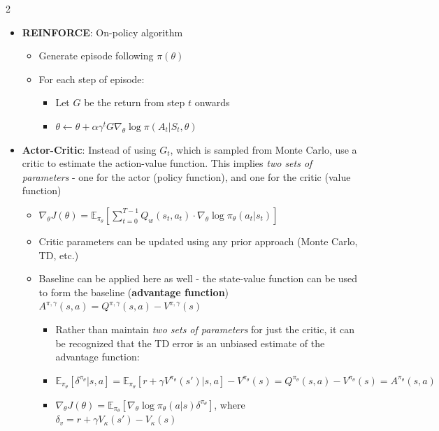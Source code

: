 \documentclass{article}
\providecommand{\tightlist}{%
  \setlength{\itemsep}{\GlobalItemSep}\setlength{\parskip}{\GlobalListParSkip}}
\newlength{\GlobalItemSep}
\newlength{\GlobalListParSkip}
\begin{document}
\begin{multicols}{2}
\begin{itemize}
  \begin{itemize}
  \tightlist
  \item
    \(\nabla_\theta J(\theta) = \mathbb{E}_\tau [\sum_{t=0}^{T-1} (G_t - b) \cdot \nabla_\theta \log \pi_\theta (a_t | s_t)]\)
    where \(b = \mathbb{E} [r_t + r_{t+1} + ... + r_{T-1}]\) (expected
    return)
  \end{itemize}
\item
  \textbf{REINFORCE}: On-policy algorithm

  \begin{itemize}
  \tightlist
  \item
    Generate episode following \(\pi(\theta)\)
  \item
    For each step of episode:

    \begin{itemize}
    \tightlist
    \item
      Let \(G\) be the return from step \(t\) onwards
    \item
      \(\theta \leftarrow \theta + \alpha \gamma^t G \nabla_\theta \log \pi (A_t | S_t, \theta)\)
    \end{itemize}
  \end{itemize}
\item
  \textbf{Actor-Critic}: Instead of using \(G_t\), which is sampled from
  Monte Carlo, use a critic to estimate the action-value function. This
  implies \emph{two sets of parameters} - one for the actor (policy
  function), and one for the critic (value function)

  \begin{itemize}
  \tightlist
  \item
    \(\nabla_\theta J(\theta) = \mathbb{E}_{\pi_\theta} [\sum_{t=0}^{T-1} Q_w (s_t, a_t) \cdot \nabla_\theta \log \pi_\theta (a_t | s_t)]\)
  \item
    Critic parameters can be updated using any prior approach (Monte
    Carlo, TD, etc.)
  \item
    Baseline can be applied here as well - the state-value function can
    be used to form the baseline (\textbf{advantage function})
    \(A^{\pi, \gamma}(s,a) = Q^{\pi, \gamma}(s, a) - V^{\pi, \gamma}(s)\)

    \begin{itemize}
    \tightlist
    \item
      Rather than maintain \emph{two sets of parameters} for just the
      critic, it can be recognized that the TD error is an unbiased
      estimate of the advantage function:
    \item
      \(\mathbb{E}_{\pi_\theta}[\delta^{\pi_\theta} | s, a] = \mathbb{E}_{\pi_\theta} [r + \gamma V^{\pi_\theta}(s') |s, a] - V^{\pi_\theta}(s) = Q^{\pi_\theta}(s, a) - V^{\pi_\theta}(s) = A^{\pi_\theta}(s,a)\)
    \item
      \(\nabla_\theta J(\theta) = \mathbb{E}_{\pi_\theta}[\nabla_\theta \log \pi_\theta (a |s)\delta^{\pi_\theta}]\),
      where \(\delta_v = r + \gamma V_{\kappa}(s') - V_\kappa (s)\)


\end{itemize}
\end{itemize}
\end{itemize}
\end{multicols}
\end{document}
